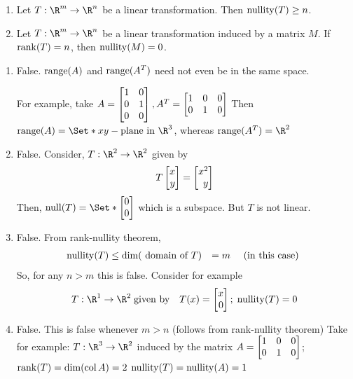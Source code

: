 \begin{exercises}
\begin{problist}
\begin{enumerate}
			\item Let $T:\R^{m}\to\R^{n}$ be a linear transformation. Then $\operatorname{nullity}(T)
				\geq n$.

			\item Let $T:\R^{m}\to\R^{n}$ be a linear transformation induced by
				a matrix $M$. If $\operatorname{rank}(T) = n$, then $\operatorname{nullity}(M) = 0$.
		\end{enumerate}


		\begin{solution}

			\begin{enumerate}
				\item False. $\operatorname{range}(A)$ and $\operatorname{range}(A^{T})$ need not even
					be in the same space.

					For example, take $A=\mat{1&0\\0&1\\0&0}, A^{T}=\mat{1&0&0\\0&1&0}$
					Then $\Range(A)=\Set*{xy-\text{plane in }\R^3}$,
					whereas $\Range(A^{T})=\R^{2}$

				\item False. Consider, $T:\R^{2}\to\R^{2}$ given by
					\[
						T\mat{x\\y}=\mat{x^2\\y}
					\]
					 Then, $\Null(T)= \Set*{\mat{0\\0}}$ which is a subspace.
					But $T$ is not linear.

				\item False. From rank-nullity theorem,
					\begin{align*}
						\operatorname{nullity}(T) & \leq \operatorname{dim}(\text{ domain of }T) & =m \quad \text{ (in this case) }
					\end{align*}So, for any $n>m$ this is false. Consider
					for example
					\begin{align*}
						 & T:\R^{1}\to\R^{2}\;\text{given by} & T(x)=\mat{x\\0};\; \Nullity(T)=0
					\end{align*}

				\item False. This is false whenever $m>n$ (follows from rank-nullity
					theorem) Take for example: $T:\R^{3}\to\R^{2}$ induced
					by the matrix $A=\mat{1&0&0\\0&1&0}$;\\ $\operatorname{rank}(T)=\operatorname{dim}(\operatorname{col}
					A)=2$ $\operatorname{nullity}(T) = \operatorname{nullity}(A)=1$
			\end{enumerate}
		\end{solution}


\end{problist}
\end{exercises}
